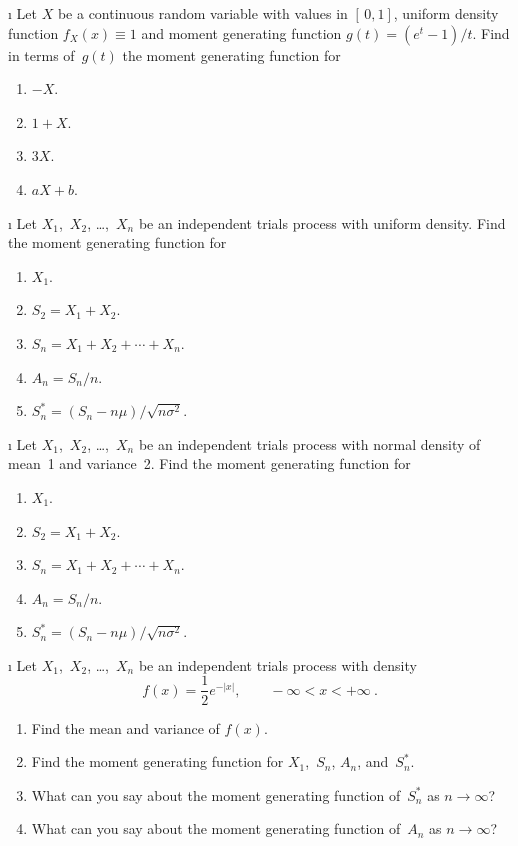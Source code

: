 \begin{LJSItem}
\i\label{exer 10.3.7} Let $X$ be a continuous random variable with values in $[\,0,1]$, 
uniform density function $f_X(x) \equiv 1$ and moment generating function $g(t) = (e^t
- 1)/t$.  Find in terms of~$g(t)$ the moment generating function for
\begin{enumerate}
\item $-X$.

\item $1 + X$.

\item $3X$.

\item $aX + b$.
\end{enumerate}

\i\label{exer 10.3.8} Let $X_1$,~$X_2$, \ldots,~$X_n$ be an independent trials process with
uniform density.  Find the moment generating function for
\begin{enumerate}
\item $X_1$.

\item $S_2 = X_1 + X_2$.

\item $S_n = X_1 + X_2 +\cdots+ X_n$.

\item $A_n = S_n/n$.

\item $S_n^* = (S_n - n\mu)/\sqrt{n\sigma^2}$.
\end{enumerate}

\i\label{exer 10.3.9} Let $X_1$,~$X_2$, \ldots,~$X_n$ be an independent trials process with
normal density of mean~1 and variance~2.  Find the moment generating function
for
\begin{enumerate}
\item $X_1$.

\item $S_2 = X_1 + X_2$.

\item $S_n = X_1 + X_2 +\cdots+ X_n$.

\item $A_n = S_n/n$.

\item $S_n^* = (S_n - n\mu)/\sqrt{n\sigma^2}$.
\end{enumerate}

\i\label{exer 10.3.10} Let $X_1$,~$X_2$, \ldots,~$X_n$ be an independent trials process with
density
$$
f(x) = \frac12 e^{-|x|}, \qquad -\infty < x < +\infty\ .
$$
\begin{enumerate}
\item Find the mean and variance of $f(x)$.

\item Find the moment generating function for $X_1$,~$S_n$, $A_n$,
and~$S_n^*$.

\item What can you say about the moment generating function of~$S_n^*$ as $n
\to \infty$?

\item What can you say about the moment generating function of~$A_n$ as $n
\to \infty$?
\end{enumerate}
 
\end{LJSItem}
